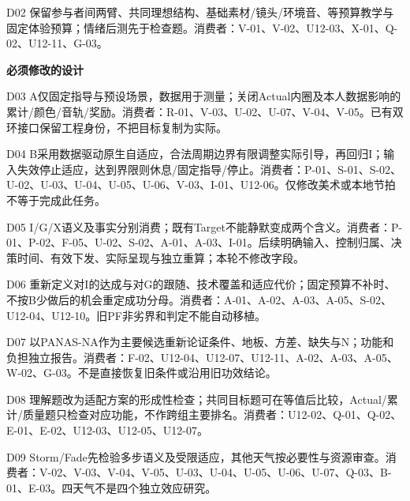 \documentclass[11pt,a4paper]{article}
\newcommand{\reviewsubsection}[1]{\par\Needspace{4\baselineskip}\vspace{4pt}\begin{center}{\titlelatin\titlecjk\bfseries\fontsize{12}{18}\selectfont #1}\end{center}}
\begin{document}
D02 保留参与者间两臂、共同理想结构、基础素材/\allowbreak{}镜头/\allowbreak{}环境音、等预算教学与固定体验预算；情绪后测先于检查题。消费者：V-\allowbreak{}01、V-\allowbreak{}02、U12-\allowbreak{}03、X-\allowbreak{}01、Q-\allowbreak{}02、U12-\allowbreak{}11、G-\allowbreak{}03。


\reviewsubsection{3.2 必须修改的设计}
D03 A仅固定指导与预设场景，数据用于测量；关闭Actual内圈及本人数据影响的累计/\allowbreak{}颜色/\allowbreak{}音轨/\allowbreak{}奖励。消费者：R-\allowbreak{}01、V-\allowbreak{}03、U-\allowbreak{}02、U-\allowbreak{}07、V-\allowbreak{}04、V-\allowbreak{}05。已有双环接口保留工程身份，不把目标复制为实际。


D04 B采用数据驱动原生自适应，合法周期边界有限调整实际引导，再回归I；输入失效停止适应，达到界限则休息/\allowbreak{}固定指导/\allowbreak{}停止。消费者：P-\allowbreak{}01、S-\allowbreak{}01、S-\allowbreak{}02、U-\allowbreak{}02、U-\allowbreak{}03、U-\allowbreak{}04、U-\allowbreak{}05、U-\allowbreak{}06、V-\allowbreak{}03、I-\allowbreak{}01、U12-\allowbreak{}06。仅修改美术或本地节拍不等于完成此任务。


D05 I/\allowbreak{}G/\allowbreak{}X语义及事实分别消费；既有Target不能静默变成两个含义。消费者：P-\allowbreak{}01、P-\allowbreak{}02、F-\allowbreak{}05、U-\allowbreak{}02、S-\allowbreak{}02、A-\allowbreak{}01、A-\allowbreak{}03、I-\allowbreak{}01。后续明确输入、控制归属、决策时间、有效下发、实际呈现与独立重算；本轮不修改字段。


D06 重新定义对I的达成与对G的跟随、技术覆盖和适应代价；固定预算不补时、不按B少做后的机会重定成功分母。消费者：A-\allowbreak{}01、A-\allowbreak{}02、A-\allowbreak{}03、A-\allowbreak{}05、S-\allowbreak{}02、U12-\allowbreak{}04、U12-\allowbreak{}10。旧PF非劣界和判定不能自动移植。


D07 以PANAS-\allowbreak{}NA作为主要候选重新论证条件、地板、方差、缺失与N；功能和负担独立报告。消费者：F-\allowbreak{}02、U12-\allowbreak{}04、U12-\allowbreak{}07、U12-\allowbreak{}11、A-\allowbreak{}02、A-\allowbreak{}03、A-\allowbreak{}05、W-\allowbreak{}02、G-\allowbreak{}03。不是直接恢复旧条件或沿用旧功效结论。


D08 理解题改为适配方案的形成性检查；共同目标题可在等值后比较，Actual/\allowbreak{}累计/\allowbreak{}质量题只检查对应功能，不作跨组主要排名。消费者：U12-\allowbreak{}02、Q-\allowbreak{}01、Q-\allowbreak{}02、E-\allowbreak{}01、E-\allowbreak{}02、U12-\allowbreak{}03、U12-\allowbreak{}05、U12-\allowbreak{}07。


D09 Storm/\allowbreak{}Fade先检验多步语义及受限适应，其他天气按必要性与资源审查。消费者：V-\allowbreak{}02、V-\allowbreak{}03、V-\allowbreak{}04、V-\allowbreak{}05、U-\allowbreak{}03、U-\allowbreak{}04、U-\allowbreak{}05、U-\allowbreak{}06、U-\allowbreak{}07、Q-\allowbreak{}03、B-\allowbreak{}01、E-\allowbreak{}03。四天气不是四个独立效应研究。
\end{document}
